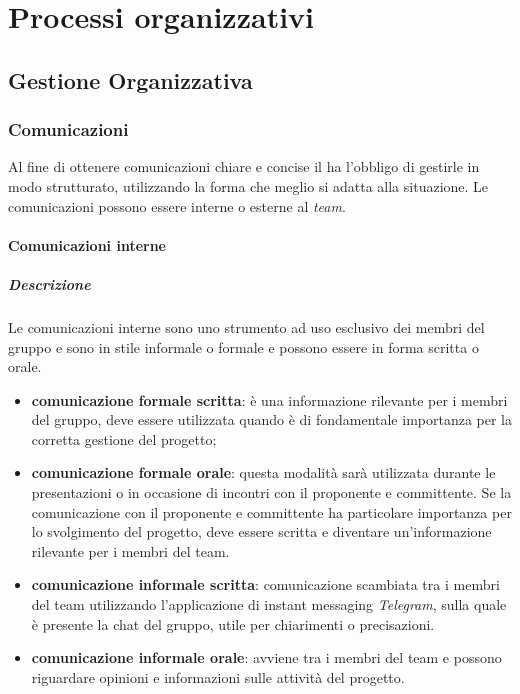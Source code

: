\newpage

\section{Processi organizzativi}

	\subsection{Gestione Organizzativa}
		
		\subsubsection{Comunicazioni}
		Al fine di ottenere comunicazioni chiare e concise il \textit{\RdP} ha l'obbligo di gestirle in modo strutturato, utilizzando la forma che meglio si adatta alla situazione. Le comunicazioni possono essere interne o esterne al \textit{team}.
			
			\paragraph{Comunicazioni interne}
			\subparagraph{Descrizione}
			Le comunicazioni interne sono uno strumento ad uso esclusivo dei membri del gruppo e sono in stile informale o formale e possono essere in forma scritta o orale. 
				\begin{itemize}
					\item \textbf{comunicazione formale scritta}: è una informazione rilevante per i membri del gruppo, deve essere utilizzata quando è di fondamentale importanza per la corretta gestione del progetto;
					\item \textbf{comunicazione formale orale}: questa modalità sarà utilizzata durante le presentazioni o in occasione di incontri con il proponente e committente. Se la comunicazione con il proponente e committente ha particolare importanza per lo svolgimento del progetto, deve essere scritta e diventare un'informazione rilevante per i membri del team.
					\item \textbf{comunicazione informale scritta}: comunicazione scambiata tra i membri del team utilizzando l'applicazione di instant messaging \textit{Telegram}, sulla quale è presente la chat del gruppo, utile per chiarimenti o precisazioni.
					\item \textbf{comunicazione informale orale}: avviene tra i membri del team e possono riguardare opinioni e informazioni sulle attività del progetto. 
				\end{itemize}

